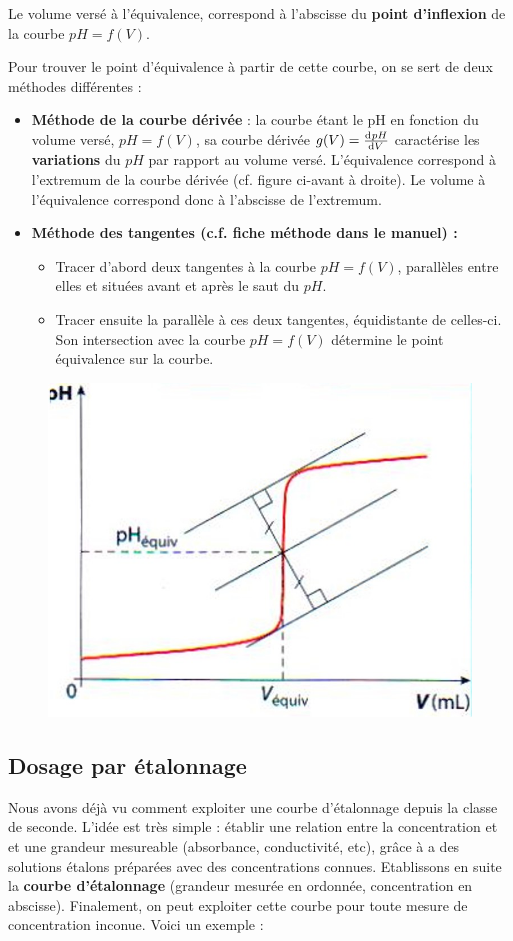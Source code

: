 \documentclass[11pt,a4paper]{article}
\begin{document}
Le volume versé à l'équivalence, correspond à l'abscisse du \textbf{point d'inflexion} de la courbe $pH=f(V)$.

Pour trouver le point d’équivalence à partir de cette courbe, on se sert de deux méthodes différentes : 
\begin{itemize}
    \item \textbf{Méthode de la courbe dérivée }: la courbe étant le pH en fonction du volume versé, $pH=f(V)$, sa courbe dérivée $g(V)=\od{pH}{V} $ caractérise les \textbf{variations} du $pH$ par rapport au volume versé.  L’équivalence correspond à l’extremum de la courbe dérivée (cf. figure ci-avant à droite). Le volume à l’équivalence correspond donc à l’abscisse de l’extremum. 
    \item \textbf{Méthode des tangentes (c.f. fiche méthode dans le manuel) : }
    \begin{itemize}
        \item Tracer d’abord deux tangentes à la courbe $pH=f(V)$, parallèles entre elles et situées avant et après le saut du $pH$.
        \item Tracer ensuite la parallèle à ces deux tangentes, équidistante de celles-ci.  Son intersection avec la courbe $pH=f(V)$ détermine le point équivalence sur la courbe.
    \end{itemize}
\end{itemize}

\begin{figure}[h]
    \centering
    \includegraphics[width=0.55\linewidth]{imgs/c1/methodetangente.jpg}
\end{figure}

\subsection{Dosage par étalonnage}

Nous avons déjà vu comment exploiter une courbe d'étalonnage depuis la classe de seconde. L'idée est très simple : établir une relation entre la concentration et et une grandeur mesureable (absorbance, conductivité, etc), grâce à a des solutions étalons préparées avec des concentrations connues. Etablissons en suite la \textbf{courbe d'étalonnage} (grandeur mesurée en ordonnée, concentration en abscisse). Finalement, on peut exploiter cette courbe pour toute mesure de concentration inconue. Voici un exemple : 
\end{document}
